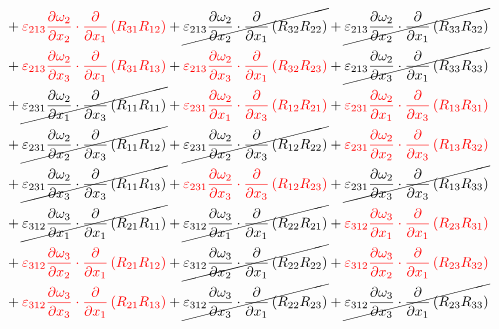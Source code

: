 \begin{equation}
\begin{split}
		&+{\color{red}\varepsilon_{213}\pdv{\omega_{2}}{x_{2}}\cdot\pdv{}{x_{1}}\left(R_{31}R_{12}\right)
}		+\cancel{\varepsilon_{213}\pdv{\omega_{2}}{x_{2}}\cdot\pdv{}{x_{1}}\left(R_{32}R_{22}\right)
}		+\cancel{\varepsilon_{213}\pdv{\omega_{2}}{x_{2}}\cdot\pdv{}{x_{1}}\left(R_{33}R_{32}\right)
}\\ 
		&+{\color{red}\varepsilon_{213}\pdv{\omega_{2}}{x_{3}}\cdot\pdv{}{x_{1}}\left(R_{31}R_{13}\right)
}		+{\color{red}\varepsilon_{213}\pdv{\omega_{2}}{x_{3}}\cdot\pdv{}{x_{1}}\left(R_{32}R_{23}\right)
}		+\cancel{\varepsilon_{213}\pdv{\omega_{2}}{x_{3}}\cdot\pdv{}{x_{1}}\left(R_{33}R_{33}\right)
}\\ 
		&+\cancel{\varepsilon_{231}\pdv{\omega_{2}}{x_{1}}\cdot\pdv{}{x_{3}}\left(R_{11}R_{11}\right)
}		+{\color{red}\varepsilon_{231}\pdv{\omega_{2}}{x_{1}}\cdot\pdv{}{x_{3}}\left(R_{12}R_{21}\right)
}		+{\color{red}\varepsilon_{231}\pdv{\omega_{2}}{x_{1}}\cdot\pdv{}{x_{3}}\left(R_{13}R_{31}\right)
}\\ 
		&+\cancel{\varepsilon_{231}\pdv{\omega_{2}}{x_{2}}\cdot\pdv{}{x_{3}}\left(R_{11}R_{12}\right)
}		+\cancel{\varepsilon_{231}\pdv{\omega_{2}}{x_{2}}\cdot\pdv{}{x_{3}}\left(R_{12}R_{22}\right)
}		+{\color{red}\varepsilon_{231}\pdv{\omega_{2}}{x_{2}}\cdot\pdv{}{x_{3}}\left(R_{13}R_{32}\right)
}\\ 
		&+\cancel{\varepsilon_{231}\pdv{\omega_{2}}{x_{3}}\cdot\pdv{}{x_{3}}\left(R_{11}R_{13}\right)
}		+{\color{red}\varepsilon_{231}\pdv{\omega_{2}}{x_{3}}\cdot\pdv{}{x_{3}}\left(R_{12}R_{23}\right)
}		+\cancel{\varepsilon_{231}\pdv{\omega_{2}}{x_{3}}\cdot\pdv{}{x_{3}}\left(R_{13}R_{33}\right)
}\\ 
		&+\cancel{\varepsilon_{312}\pdv{\omega_{3}}{x_{1}}\cdot\pdv{}{x_{1}}\left(R_{21}R_{11}\right)
}		+\cancel{\varepsilon_{312}\pdv{\omega_{3}}{x_{1}}\cdot\pdv{}{x_{1}}\left(R_{22}R_{21}\right)
}		+{\color{red}\varepsilon_{312}\pdv{\omega_{3}}{x_{1}}\cdot\pdv{}{x_{1}}\left(R_{23}R_{31}\right)
}\\ 
		&+{\color{red}\varepsilon_{312}\pdv{\omega_{3}}{x_{2}}\cdot\pdv{}{x_{1}}\left(R_{21}R_{12}\right)
}		+\cancel{\varepsilon_{312}\pdv{\omega_{3}}{x_{2}}\cdot\pdv{}{x_{1}}\left(R_{22}R_{22}\right)
}		+{\color{red}\varepsilon_{312}\pdv{\omega_{3}}{x_{2}}\cdot\pdv{}{x_{1}}\left(R_{23}R_{32}\right)
}\\ 
		&+{\color{red}\varepsilon_{312}\pdv{\omega_{3}}{x_{3}}\cdot\pdv{}{x_{1}}\left(R_{21}R_{13}\right)
}		+\cancel{\varepsilon_{312}\pdv{\omega_{3}}{x_{3}}\cdot\pdv{}{x_{1}}\left(R_{22}R_{23}\right)
}		+\cancel{\varepsilon_{312}\pdv{\omega_{3}}{x_{3}}\cdot\pdv{}{x_{1}}\left(R_{23}R_{33}\right)
}
\end{split}
\end{equation}
